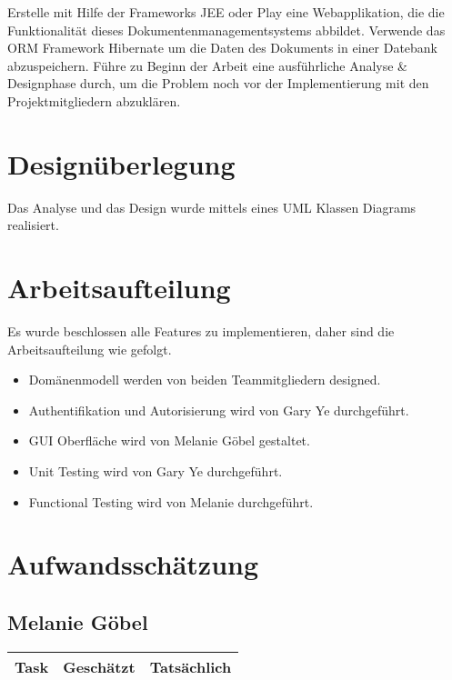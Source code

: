 \documentclass[11pt, a4paper]{article}
\begin{document}
Erstelle mit Hilfe der Frameworks JEE oder Play eine Webapplikation, die die Funktionalität dieses Dokumentenmanagementsystems abbildet. Verwende das ORM Framework Hibernate um die Daten des Dokuments in einer Datebank abzuspeichern. Führe zu Beginn der Arbeit eine ausführliche Analyse \& Designphase durch, um die Problem noch vor der Implementierung mit den Projektmitgliedern abzuklären.

\section{Designüberlegung}

Das Analyse und das Design wurde mittels eines UML Klassen Diagrams realisiert.


\section{Arbeitsaufteilung}

Es wurde beschlossen alle Features zu implementieren, daher sind die Arbeitsaufteilung wie gefolgt. 

\begin{itemize}
  \item Domänenmodell werden von beiden Teammitgliedern designed.
  \item Authentifikation und Autorisierung wird von Gary Ye durchgeführt.
  \item GUI Oberfläche wird von Melanie Göbel gestaltet.
  \item Unit Testing wird von Gary Ye durchgeführt.
  \item Functional Testing wird von Melanie durchgeführt.
\end{itemize}

\section{Aufwandsschätzung}

\subsection*{Melanie Göbel}
\begin{center}
  \begin{tabular}{| l | l | l |}
    \hline
    Task & Geschätzt & Tatsächlich \\ \hline
    
  \end{tabular}
\end{center}
\end{document}
